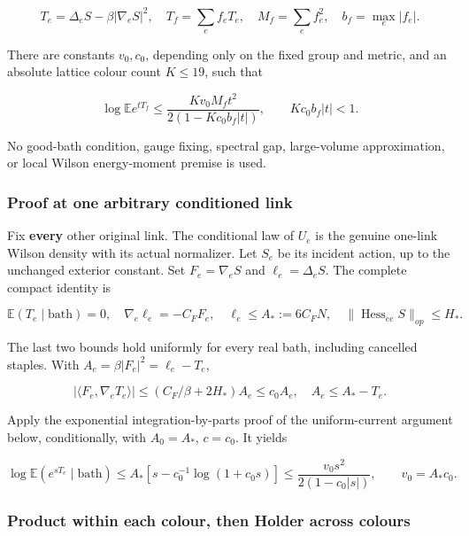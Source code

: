 \documentclass[
  11pt,
]{article}
\begin{document}
\[
 T_e=\Delta_eS-\beta|\nabla_eS|^2,\quad
 T_f=\sum_e f_eT_e,\quad M_f=\sum_e f_e^2,\quad b_f=\max_e|f_e|.
\]

There are constants \(v_0,c_0\), depending only on the fixed group and
metric, and an absolute lattice colour count \(K\le19\), such that

\[
 \boxed{\quad
 \log\mathbb E e^{tT_f}
 \le \frac{K v_0 M_f t^2}{2(1-Kc_0b_f|t|)},
 \qquad Kc_0b_f|t|<1.
 \quad} \tag{W1}
\]

No good-bath condition, gauge fixing, spectral gap, large-volume
approximation, or local Wilson energy-moment premise is used.

\hypertarget{proof-at-one-arbitrary-conditioned-link}{%
\subsubsection{Proof at one arbitrary conditioned
link}\label{proof-at-one-arbitrary-conditioned-link}}

Fix \textbf{every} other original link. The conditional law of \(U_e\)
is the genuine one-link Wilson density with its actual normalizer. Let
\(S_e\) be its incident action, up to the unchanged exterior constant.
Set \(F_e=\nabla_eS\) and \(\ell_e=\Delta_eS\). The complete compact
identity is

\[
 \mathbb E(T_e\mid\text{bath})=0,
 \quad \nabla_e\ell_e=-C_FF_e,
 \quad \ell_e\le A_*:=6C_FN,
 \quad \|\operatorname{Hess}_{ee}S\|_{op}\le H_*.
\]

The last two bounds hold uniformly for every real bath, including
cancelled staples. With \(A_e=\beta|F_e|^2=\ell_e-T_e\),

\[
 |\langle F_e,\nabla_eT_e\rangle|
 \le (C_F/\beta+2H_*)A_e\le c_0A_e,
 \quad A_e\le A_*-T_e.
\]

Apply the exponential integration-by-parts proof of the uniform-current
argument below, conditionally, with \(A_0=A_*\), \(c=c_0\). It yields

\[
 \log\mathbb E(e^{sT_e}\mid\text{bath})
 \le A_*\left[s-c_0^{-1}\log(1+c_0s)\right]
 \le\frac{v_0s^2}{2(1-c_0|s|)},\qquad v_0=A_*c_0. \tag{W2}
\]

\hypertarget{product-within-each-colour-then-holder-across-colours}{%
\subsubsection{Product within each colour, then Holder across
colours}\label{product-within-each-colour-then-holder-across-colours}}
\end{document}

